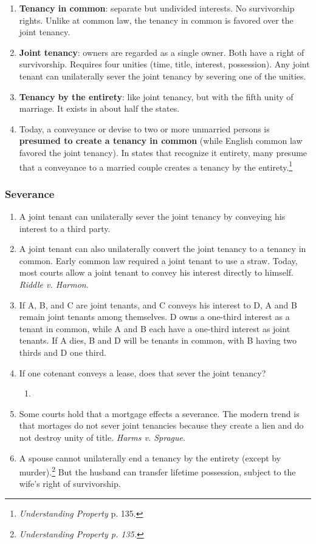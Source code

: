 \begin{enumerate}
    \item \textbf{Tenancy in common}: separate but undivided interests. No 
    survivorship rights. Unlike at common law, the tenancy in common is 
    favored over the joint tenancy.
    \item \textbf{Joint tenancy}: owners are regarded as a single owner. Both 
    have a right of survivorship. Requires four unities (time, title, 
    interest, possession). Any joint tenant can unilaterally sever the joint 
    tenancy by severing one of the unities.
    \item \textbf{Tenancy by the entirety}: like joint tenancy, but with the 
    fifth unity of marriage. It exists in about half the states.
    \item Today, a conveyance or devise to two or more unmarried persons is 
    \textbf{presumed to create a tenancy in common} (while English common law 
    favored the joint tenancy). In states that recognize it entirety, many 
    presume that a conveyance to a married couple creates a tenancy by the 
    entirety.\footnote{\emph{Understanding Property} p. 135.}
\end{enumerate}

\subsubsection{Severance}

\begin{enumerate}
    \item A joint tenant can unilaterally sever the joint tenancy by conveying 
    his interest to a third party.
    \item A joint tenant can also unilaterally convert the joint tenancy to a 
    tenancy in common. Early common law required a joint tenant to use a 
    straw. Today, most courts allow a joint tenant to convey his interest 
    directly to himself. \emph{Riddle v. Harmon}.
    \item If A, B, and C are joint tenants, and C conveys his interest to D, A 
    and B remain joint tenants among themselves. D owns a one-third interest 
    as a tenant in common, while A and B each have a one-third interest as 
    joint tenants. If A dies, B and D will be tenants in common, with B having 
    two thirds and D one third.
    \item If one cotenant conveys a lease, does that sever the joint tenancy?
    \begin{enumerate}
        \item %
    \end{enumerate}
    \item Some courts hold that a mortgage effects a severance. The modern 
    trend is that mortages do not sever joint tenancies because they create a 
    lien and do not destroy unity of title. \emph{Harms v. Sprague}.
    \item A spouse cannot unilaterally end a tenancy by the entirety (except 
    by murder).\footnote{\emph{Understanding Property p. 135.}} But the 
    husband can transfer lifetime possession, subject to the wife's right of 
    survivorship.
\end{enumerate}

